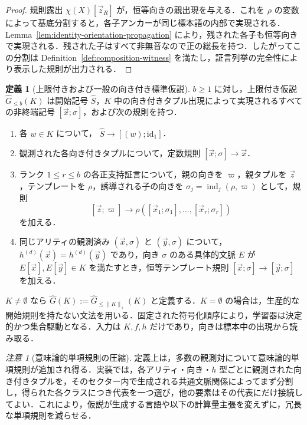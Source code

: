 \documentclass[11pt,a4paper]{ltjsarticle}
\numberwithin{equation}{section}
\theoremstyle{plain}
\theoremstyle{definition}
\newtheorem{definition}[theorem]{定義}
\theoremstyle{remark}
\newtheorem{remark}[theorem]{注意}
\newcommand{\tuple}[1]{\vec{#1}}
\begin{document}
\begin{proof}
規則露出 \(\chi(X)[\tuple z_R]\) が，恒等向きの親出現を与える．これを \(\rho\) の変数によって基底分割すると，各子アンカーが同じ標本語の内部で実現される．Lemma~\ref{lem:identity-orientation-propagation} により，残された各子も恒等向きで実現される．残された子はすべて非無音なので正の総長を持つ．したがってこの分割は Definition~\ref{def:composition-witness} を満たし，証言列挙の完全性により表示した規則が出力される．
\end{proof}

\begin{definition}[上限付きおよび一般の向き付き標準仮説]
\label{def:learner}
\(b\ge1\) に対し，上限付き仮説 \(\widehat G_{\le b}(K)\) は開始記号 \(\widehat S\)，\(K\) 中の向き付きタプル出現によって実現されるすべての非終端記号 \([\tuple x;\sigma]\)，および次の規則を持つ．
\begin{enumerate}[label=(\roman*),leftmargin=*]
\item 各 \(w\in K\) について，
      \(\widehat S\to[(w);\mathrm{id}_1]\)．
\item 観測された各向き付きタプルについて，定数規則
      \([\tuple x;\sigma]\to\tuple x\)．
\item ランク \(1\le r\le b\) の各正支持証言について，親の向きを \(\varpi\)，親タプルを \(\tuple z\)，テンプレートを \(\rho\)，誘導される子の向きを
      \(\sigma_j=\operatorname{ind}_j(\rho,\varpi)\)
      として，規則
      \[
        [\tuple z;\varpi]\to
        \rho([\tuple x_1;\sigma_1],\ldots,[\tuple x_r;\sigma_r])
      \]
      を加える．
\item 同じアリティの観測済み \((\tuple x,\sigma)\) と \((\tuple y,\sigma)\) について，
      \(h^{(d)}(\tuple x)=h^{(d)}(\tuple y)\) であり，向き \(\sigma\) のある具体的文脈 \(E\) が
      \(E[\tuple x],E[\tuple y]\in K\)
      を満たすとき，恒等テンプレート規則
      \([\tuple x;\sigma]\to[\tuple y;\sigma]\)
      を加える．
\end{enumerate}
\(K\ne\emptyset\) なら
\(\widehat G(K):=\widehat G_{\le\|K\|_+}(K)\)
と定義する．\(K=\emptyset\) の場合は，生産的な開始規則を持たない文法を用いる．固定された符号化順序により，学習器は決定的かつ集合駆動となる．入力は \(K,f,h\) だけであり，向きは標本中の出現から読み取る．
\end{definition}

\begin{remark}[意味論的単項規則の圧縮]
定義上は，多数の観測対について意味論的単項規則が追加され得る．実装では，各アリティ・向き・\(h\) 型ごとに観測された向き付きタプルを，そのセクター内で生成される共通文脈関係によってまず分割し，得られた各クラスにつき代表を一つ選び，他の要素はその代表にだけ接続してよい．これにより，仮説が生成する言語や以下の計算量主張を変えずに，冗長な単項規則を減らせる．
\end{remark}
\end{document}
